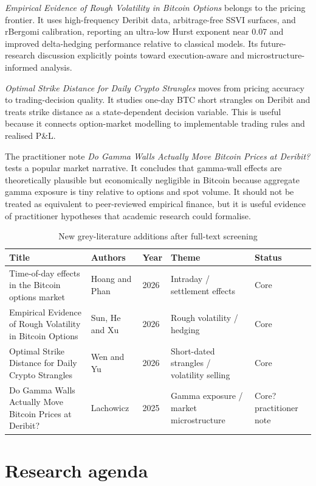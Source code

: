 \documentclass[11pt,a4paper]{article}
\begin{document}
\emph{Empirical Evidence of Rough Volatility in Bitcoin Options} belongs to the pricing frontier. It uses high-frequency Deribit data, arbitrage-free SSVI surfaces, and rBergomi calibration, reporting an ultra-low Hurst exponent near 0.07 and improved delta-hedging performance relative to classical models. Its future-research discussion explicitly points toward execution-aware and microstructure-informed analysis.

\emph{Optimal Strike Distance for Daily Crypto Strangles} moves from pricing accuracy to trading-decision quality. It studies one-day BTC short strangles on Deribit and treats strike distance as a state-dependent decision variable. This is useful because it connects option-market modelling to implementable trading rules and realised P\&L.

The practitioner note \emph{Do Gamma Walls Actually Move Bitcoin Prices at Deribit?} tests a popular market narrative. It concludes that gamma-wall effects are theoretically plausible but economically negligible in Bitcoin because aggregate gamma exposure is tiny relative to options and spot volume. It should not be treated as equivalent to peer-reviewed empirical finance, but it is useful evidence of practitioner hypotheses that academic research could formalise.

\begin{table}[h!]
\centering
\caption{New grey-literature additions after full-text screening}
\small
\begin{tabularx}{\textwidth}{X p{2.8cm} p{0.7cm} p{3.0cm} p{1.8cm}}
\toprule
Title & Authors & Year & Theme & Status \\
\midrule
Time-of-day effects in the Bitcoin options market & Hoang and Phan & 2026 & Intraday / settlement effects & Core \\
Empirical Evidence of Rough Volatility in Bitcoin Options & Sun, He and Xu & 2026 & Rough volatility / hedging & Core \\
Optimal Strike Distance for Daily Crypto Strangles & Wen and Yu & 2026 & Short-dated strangles / volatility selling & Core \\
Do Gamma Walls Actually Move Bitcoin Prices at Deribit? & Lachowicz & 2025 & Gamma exposure / market microstructure & Core? practitioner note \\
\bottomrule
\end{tabularx}
\end{table}

\section{Research agenda}
\end{document}
